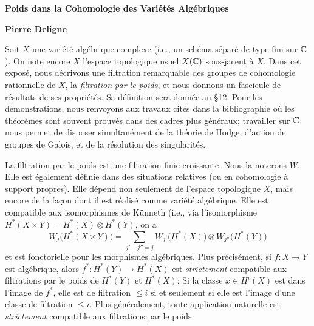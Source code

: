 \documentclass[8pt]{extarticle}
\begin{document}
\ReaderFont


\vspace*{15mm}
\begin{center}
{\sffamily\bfseries\fontsize{15}{17}\selectfont Poids dans la Cohomologie des Variétés Algébriques\par}
\vspace{5mm}
{\sffamily\bfseries\fontsize{10}{11}\selectfont Pierre Deligne\par}
\end{center}
\vspace{5mm}

 Soit \(X\) une variété algébrique complexe (i.e., un schéma séparé de type fini sur \(\mathbb{C}\)). On note encore \(X\) l'espace topologique usuel \(X(\mathbb{C})\) sous-jacent à \(X\). Dans cet exposé, nous décrivons une filtration remarquable des groupes de cohomologie rationnelle de \(X\), la \emph{filtration par le poids}, et nous donnons un fascicule de résultats de ses propriétés. Sa définition sera donnée au §12. Pour les démonstrations, nous renvoyons aux travaux cités dans la bibliographie où les théorèmes sont souvent prouvés dans des cadres plus généraux; travailler sur \(\mathbb{C}\) nous permet de disposer simultanément de la théorie de Hodge, d'action de groupes de Galois, et de la résolution des singularités.

La filtration par le poids est une filtration finie croissante. Nous la noterons \(W\). Elle est également définie dans des situations relatives (ou en cohomologie à support propres). Elle dépend non seulement de l'espace topologique \(X\), mais encore de la façon dont il est réalisé comme variété algébrique. Elle est compatible aux isomorphismes de Künneth (i.e., via l'isomorphisme \(H^*(X\times Y)=H^*(X)\otimes H^*(Y)\), on a
\[
W_j\bigl(H^*(X\times Y)\bigr)=\sum_{j'+j''=j}W_{j'}\bigl(H^*(X)\bigr)\otimes W_{j''}\bigl(H^*(Y)\bigr)
\]
et est fonctorielle pour les morphismes algébriques. Plus précisément, si \(f:X\to Y\) est algébrique, alors \(f^*:H^*(Y)\to H^*(X)\) est \emph{strictement} compatible aux filtrations par le poids de \(H^*(Y)\) et \(H^*(X)\): Si la classe \(x\in H^i(X)\) est dans l'image de \(f^*\), elle est de filtration \(\le i\) si et seulement si elle est l'image d'une classe de filtration \(\le i\). Plus généralement, toute application naturelle est \emph{strictement} compatible aux filtrations par le poids.
\end{document}
